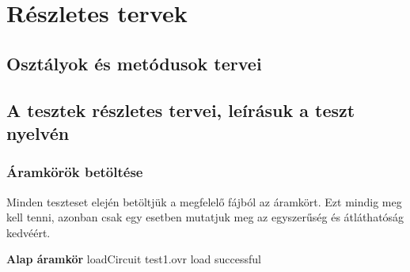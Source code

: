 %
\chapter{Részletes tervek}

\thispagestyle{fancy}

\section{Osztályok és metódusok tervei}






\section{A tesztek részletes tervei, leírásuk a teszt nyelvén}

\subsection{Áramkörök betöltése}
Minden teszteset elején betöltjük a megfelelő fájból az áramkört. Ezt mindig meg kell tenni, azonban csak egy esetben mutatjuk meg az egyszerűség és átláthatóság kedvéért.

\textbf{Alap áramkör}\newline
loadCircuit test1.ovr\newline
\newline
load successful



